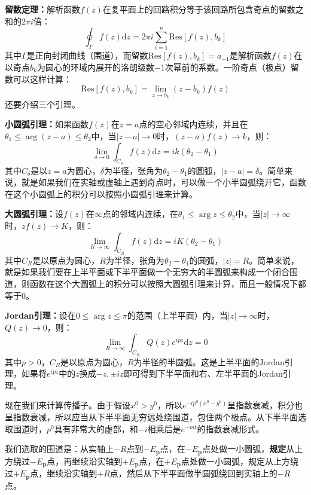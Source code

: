 \documentclass{book}
\begin{document}
\textbf{留数定理：}解析函数$f(z)$在复平面上的回路积分等于该回路所包含奇点的留数之和的$2\pi i$倍：
$$
\oint_\Gamma f(z)\mathrm{d}z=2\pi i\sum_{i=1}^n \mathrm{Res}[f(z),b_k]
$$
其中$\Gamma$是正向封闭曲线（围道），而留数$\mathrm{Res}[f(z),b_k]=a_{-1}$是解析函数$f(z)$在以奇点$b_k$为圆心的环域内展开的洛朗级数$-1$次幂前的系数。一阶奇点（极点）留数可以这样计算：
$$
\mathrm{Res}[f(z),b_k]=\lim_{z\to b_k}(z-b_k)f(z)
$$
还要介绍三个引理。

\textbf{小圆弧引理：}如果函数$f(z)$在$z=a$点的空心邻域内连续，并且在$\theta_1\leqslant\arg(z-a)\leqslant \theta_2$中，当$|z-a|\to 0$时，$(z-a)f(z)\to k$，则：
$$
\operatorname*{lim}_{\delta\to0}\int_{C_{\delta}}f(z)\mathrm{d}z={i}k(\theta_{2}-\theta_{1})
$$
其中$C_\delta$是以$z=a$为圆心，$\delta$为半径，张角为$\theta_2-\theta_1$的圆弧，$|z-a|=\delta$。简单来说，就是如果我们在实轴或虚轴上遇到奇点时，可以做一个小半圆弧绕开它，函数在这个小圆弧上的积分可以按照小圆弧引理来计算。

\textbf{大圆弧引理：}设$f(z)$在$\infty$点的邻域内连续，在$\theta_1\leqslant\arg z\leqslant \theta_2$中，当$|z|\to\infty$时，$zf(z)\to K$，则：
$$
\lim_{R\to\infty}\int_{C_{R}}f(z)\mathrm{d}z={i}K(\theta_{2}-\theta_{1})
$$
其中$C_R$是以原点为圆心，$R$为半径，张角为$\theta_2-\theta_1$的圆弧，$|z|=R$。简单来说，就是如果我们要在上半平面或下半平面做一个无穷大的半圆弧来构成一个闭合围道，则函数在这个大圆弧上的积分可以按照大圆弧引理来计算，而且一般情况下都等于$0$。

\textbf{Jordan引理：}设在$0\leqslant \arg z\leqslant \pi$的范围（上半平面）内，当$|z|\to\infty$时，$Q(z)\to 0$，则：
$$
\lim_{R\to\infty}\int_{C_R}Q(z)e^{ipz}\mathrm{d}z=0
$$
其中$p>0$，$C_R$是以原点为圆心，$R$为半径的半圆弧。这是上半平面的Jordan引理，如果将$e^{ipz}$中的$z$换成$-z,\pm iz$即可得到下半平面和右、左半平面的Jordan引理。

现在我们来计算传播子。由于假设$x^0>y^0$，所以$e^{-ip^0(x^0-y^0)}$呈指数衰减，积分也呈指数衰减，所以应当从下半平面无穷远处绕围道，包住两个极点。从下半平面选取围道时，$p^0$具有非常大的虚部，和$-i$相乘后是$e^{-mt}$的指数衰减形式。

我们选取的围道是：从实轴上$-R$点到$-E_\mathbf{p}$点，在$-E_\mathbf{p}$点处做一小圆弧，\textbf{规定}从上方绕过$-E_\mathbf{p}$点，再继续沿实轴到$+E_\mathbf{p}$点，在$+E_\mathbf{p}$点处做一小圆弧，规定从上方绕过$+E_\mathbf{p}$点，继续沿实轴到$+R$点，然后从下半平面做半圆弧绕回到实轴上的$-R$点。
\end{document}

